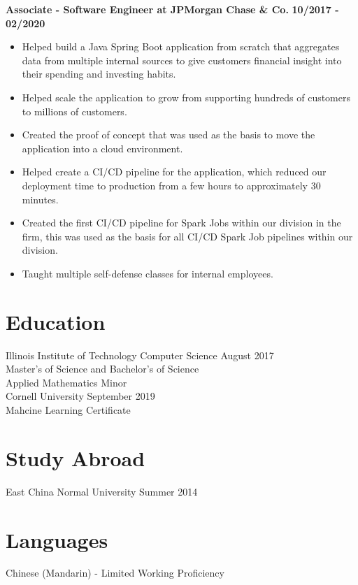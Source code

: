 \documentclass{res}
\begin{document}
\begin{resume}
	\textbf{Associate - Software Engineer at JPMorgan Chase \& Co.}
	\hfill{\bf 10/2017 - 02/2020}
	\begin{itemize}
		\item Helped build a Java Spring Boot application from scratch that aggregates data from multiple internal sources
to give customers financial insight into their spending and investing habits.
		\item Helped scale the application to grow from supporting hundreds of customers to millions of customers.
		\item Created the proof of concept that was used as the basis to move the application into a cloud environment.
		\item Helped create a CI/CD pipeline for the application, which reduced our deployment time to production from a few hours to approximately 30 minutes.
		\item Created the first CI/CD pipeline for Spark Jobs within our division in the firm, this was used as the basis for all CI/CD Spark Job pipelines within our division.
		\item Taught multiple self-defense classes for internal employees.
	\end{itemize}

	\section{\large{Education}}
	Illinois Institute of Technology \hfill
	{\centering Computer Science} 
	 \hfill August 2017 \\
	Master's of Science and Bachelor's of Science \\
	Applied Mathematics Minor \\
	\newline
	\newline
	Cornell University \hfill September 2019 \\
	Mahcine Learning Certificate
	
	\section{\large{Study Abroad}}
	East China Normal University \hfill Summer 2014  
	
	\section{\large{Languages}}
	Chinese (Mandarin) - Limited Working Proficiency
\end{resume}
\end{document}
